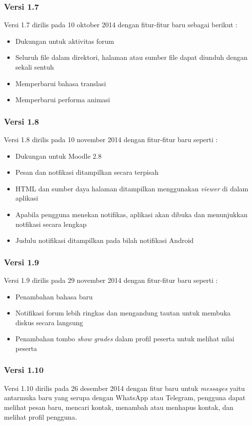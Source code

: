 \subsubsection{Versi 1.7}
Versi 1.7 dirilis pada 10 oktober 2014 dengan fitur-fitur baru sebagai berikut :  \cite{Moodlemobile:version1:intro}
	\begin{itemize}
		\item Dukungan untuk aktivitas forum
		\item Seluruh file dalam direktori, halaman atau sumber file dapat diunduh dengan sekali sentuh
		\item Memperbarui bahasa translasi
		\item Memperbarui performa animasi 
	\end{itemize}
\subsubsection{Versi 1.8}
Versi 1.8 dirilis pada 10 november 2014 dengan fitur-fitur baru seperti :\cite{Moodlemobile:version1:intro}
	\begin{itemize}
		\item Dukungan untuk Moodle 2.8
		\item Pesan dan notfikasi ditampilkan secara terpisah
		\item HTML dan sumber daya halaman ditampilkan menggunakan \textit{viewer} di dalam aplikasi
		\item Apabila pengguna menekan notifikas, aplikasi akan dibuka dan menunjukkan notfikasi secara lengkap
		\item Judulu notifikasi ditampilkan pada bilah notifikasi Android
	\end{itemize}
\subsubsection{Versi 1.9}
Versi 1.9 dirilis pada 29 november 2014 dengan fitur-fitur baru seperti : \cite{Moodlemobile:version1:intro}
	\begin{itemize}
		\item Penambahan bahasa baru
		\item Notifikasi forum lebih ringkas dan mengandung tautan untuk membuka diskus secara langsung
		\item Penambahan tombo \textit{show grades} dalam profil peserta untuk melihat nilai peserta
	\end{itemize}
\subsubsection{Versi 1.10}
Versi 1.10 dirilis pada 26 desember 2014 dengan fitur baru untuk \textit{messages} yaitu antarmuka baru yang serupa dengan WhatsApp atau Telegram, pengguna dapat melihat pesan baru,  mencari kontak, menambah atau menhapus kontak, dan melihat profil pengguna. \cite{Moodlemobile:version1:1.10}

